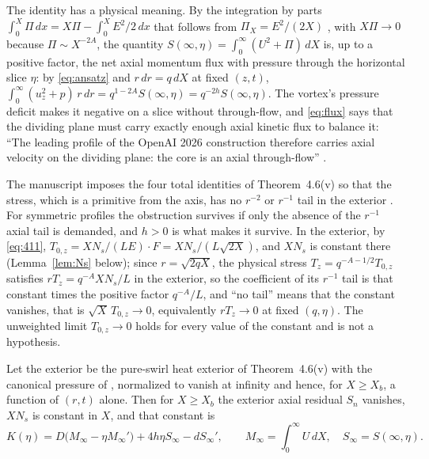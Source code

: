 \documentclass[11pt]{article}
\newcommand{\Sn}{S_n}
\newcommand{\Ns}{N_s}
\begin{document}
The identity has a physical meaning. By the integration by parts $\int_0^X\Pi\,dx=X\Pi-\int_0^XE^2/2\,dx$ that follows from $\Pi_X=E^2/(2X)$ \cite[p.~28]{OpenAINS}, with $X\Pi\to0$ because $\Pi\sim X^{-2A}$, the quantity $S(\infty,\eta)=\int_0^\infty(U^2+\Pi)\,dX$ is, up to a positive factor, the net axial momentum flux with pressure through the horizontal slice $\eta$: by \eqref{eq:ansatz} and $r\,dr=q\,dX$ at fixed $(z,t)$, $\int_0^\infty(u_z^2+p)\,r\,dr=q^{1-2A}S(\infty,\eta)=q^{-2h}S(\infty,\eta)$. The vortex's pressure deficit makes it negative on a slice without through-flow, and \eqref{eq:flux} says that the dividing plane must carry exactly enough axial kinetic flux to balance it: ``The leading profile of the OpenAI 2026 construction therefore carries axial velocity on the dividing plane: the core is an axial through-flow'' \cite[p.~20]{Duraiswami}.

The manuscript imposes the four total identities of Theorem~4.6(v) so that the stress, which is a primitive from the axis, has no $r^{-2}$ or $r^{-1}$ tail in the exterior \cite[p.~30 and Lemma~A.8, pp.~140--141]{OpenAINS}. For symmetric profiles the obstruction survives if only the absence of the $r^{-1}$ axial tail is demanded, and $h>0$ is what makes it survive. In the exterior, by \eqref{eq:411}, $T_{0,z}=X\Ns/(LE)\cdot F=X\Ns/(L\sqrt{2X})$, and $X\Ns$ is constant there (Lemma~\ref{lem:Ns} below); since $r=\sqrt{2qX}$, the physical stress $T_z=q^{-A-1/2}T_{0,z}$ satisfies $rT_z=q^{-A}X\Ns/L$ in the exterior, so the coefficient of its $r^{-1}$ tail is that constant times the positive factor $q^{-A}/L$, and ``no tail'' means that the constant vanishes, that is $\sqrt X\,T_{0,z}\to0$, equivalently $rT_z\to0$ at fixed $(q,\eta)$. The unweighted limit $T_{0,z}\to0$ holds for every value of the constant and is not a hypothesis.

\begin{lemma}\label{lem:Ns}
Let the exterior be the pure-swirl heat exterior of Theorem~4.6(v) with the canonical pressure of \cite[(4.25), p.~33]{OpenAINS}, normalized to vanish at infinity and hence, for $X\ge X_b$, a function of $(r,t)$ alone. Then for $X\ge X_b$ the exterior axial residual $\Sn$ vanishes, $X\Ns$ is constant in $X$, and that constant is
\begin{equation}\label{eq:K}
K(\eta)=D\bigl(M_\infty-\eta M_\infty'\bigr)+4h\eta S_\infty-dS_\infty',\qquad M_\infty=\int_0^\infty U\,dX,\quad S_\infty=S(\infty,\eta).
\end{equation}
\end{lemma}
\end{document}
